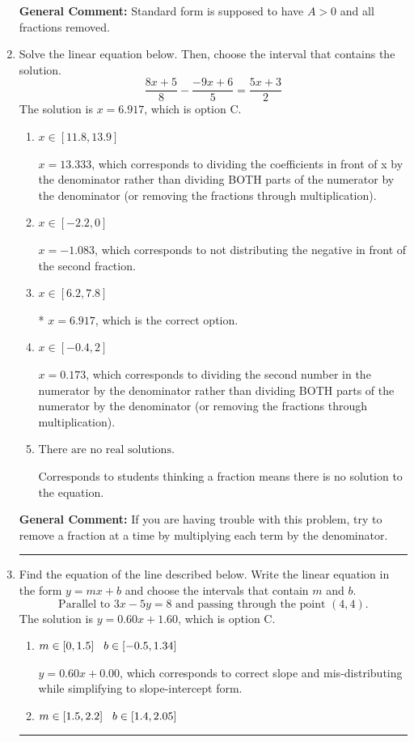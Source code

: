 \documentclass{extbook}[14pt]
\newcommand{\litem}[1]{\item #1

\rule{\textwidth}{0.4pt}}
\begin{document}
\begin{enumerate}
{\textbf{General Comment:} Standard form is supposed to have $A > 0$ and all fractions removed.
}
\litem{
Solve the linear equation below. Then, choose the interval that contains the solution.
\[ \frac{8x + 5}{8} - \frac{-9x + 6}{5} = \frac{5x + 3}{2} \]The solution is \( x = 6.917 \), which is option C.\begin{enumerate}[label=\Alph*.]
\item \( x \in [11.8, 13.9] \)

 $x = 13.333$, which corresponds to dividing the coefficients in front of x by the denominator rather than dividing BOTH parts of the numerator by the denominator (or removing the fractions through multiplication).
\item \( x \in [-2.2, 0] \)

 $x = -1.083$, which corresponds to not distributing the negative in front of the second fraction.
\item \( x \in [6.2, 7.8] \)

* $x = 6.917$, which is the correct option.
\item \( x \in [-0.4, 2] \)

 $x = 0.173$, which corresponds to dividing the second number in the numerator by the denominator rather than dividing BOTH parts of the numerator by the denominator (or removing the fractions through multiplication).
\item \( \text{There are no real solutions.} \)

Corresponds to students thinking a fraction means there is no solution to the equation.
\end{enumerate}

\textbf{General Comment:} If you are having trouble with this problem, try to remove a fraction at a time by multiplying each term by the denominator.
}
\litem{
Find the equation of the line described below. Write the linear equation in the form $ y=mx+b $ and choose the intervals that contain $m$ and $b$.
\[ \text{Parallel to } 3 x - 5 y = 8 \text{ and passing through the point } (4, 4). \]The solution is \( y = 0.60x + 1.60 \), which is option C.\begin{enumerate}[label=\Alph*.]
\item \( m \in [0, 1.5] \hspace*{3mm} b \in [-0.5, 1.34] \)

 $y = 0.60x + 0.00$, which corresponds to correct slope and mis-distributing while simplifying to slope-intercept form.
\item \( m \in [1.5, 2.2] \hspace*{3mm} b \in [1.4, 2.05] \)


\end{enumerate}}
\end{enumerate}
\end{document}
